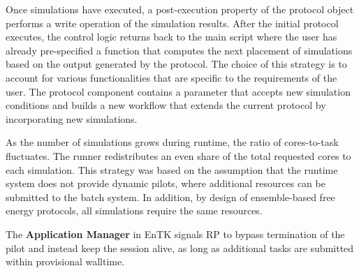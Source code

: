 Once simulations have executed, a post-execution property of the protocol object
performs a write operation of the simulation results. After the initial protocol 
executes, the control logic returns back to the main script where the user has 
already pre-specified a function that computes the next placement of simulations 
based on the output generated by the protocol. The choice of this strategy is to 
account for various functionalities that are specific to the requirements of the 
user. The protocol component contains a parameter that accepts new simulation 
conditions and builds a new workflow that extends the current protocol by 
incorporating new simulations.

As the number of simulations grows during runtime, the ratio of cores-to-task 
fluctuates. The runner redistributes an even share of the total requested cores 
to each simulation. This strategy was based on the assumption that the runtime 
system does not provide dynamic pilots, where additional resources can be 
submitted to the batch system. In addition, by design of ensemble-based free
energy protocols, all simulations require the same resources. 

The \textbf{Application Manager} in EnTK signals RP to 
bypass termination of the pilot and instead keep the session alive, as long as 
additional tasks are submitted within provisional walltime. 










